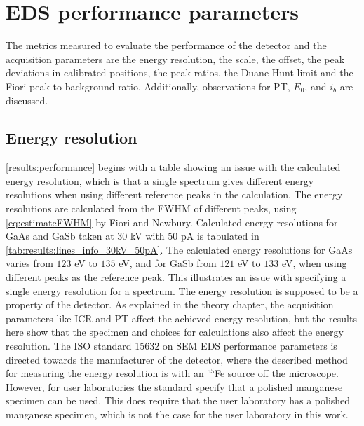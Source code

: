 \section{EDS performance parameters}
\label{discussion:performance}

The metrics measured to evaluate the performance of the detector and the acquisition parameters are the energy resolution, the scale, the offset, the peak deviations in calibrated positions, the peak ratios, the Duane-Hunt limit and the Fiori peak-to-background ratio.
Additionally, observations for PT, $E_0$, and $i_b$ are discussed.



\subsection{Energy resolution}
\label{discussion:energy_resolution}


\cref{results:performance} begins with a table showing an issue with the calculated energy resolution, which is that a single spectrum gives different energy resolutions when using different reference peaks in the calculation.
The energy resolutions are calculated from the FWHM of different peaks, using \cref{eq:estimateFWHM} by Fiori and Newbury.
Calculated energy resolutions for GaAs and GaSb taken at $30$ kV with $50$ pA is tabulated in \cref{tab:results:lines_info_30kV_50pA}.
The calculated energy resolutions for GaAs varies from $123$ eV to $135$ eV, and for GaSb from $121$ eV to $133$ eV,  when using different peaks as the reference peak.
This illustrates an issue with specifying a single energy resolution for a spectrum.
The energy resolution is supposed to be a property of the detector.
As explained in the theory chapter, the acquisition parameters like ICR and PT affect the achieved energy resolution, but the results here show that the specimen and choices for calculations also affect the energy resolution.
The ISO standard 15632 \cite{iso_qc_15632} on SEM EDS performance parameters is directed towards the manufacturer of the detector, where the described method for measuring the energy resolution is with an $^{55}$Fe source off the microscope.
However, for user laboratories the standard specify that a polished manganese specimen can be used.
This does require that the user laboratory has a polished manganese specimen, which is not the case for the user laboratory in this work.


